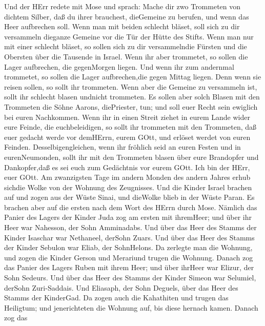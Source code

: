  Und der HErr redete mit Mose und sprach:  Mache
dir zwo Trommeten von dichtem Silber, daß du ihrer brauchest, dieGemeine
zu berufen, und wenn das Heer aufbrechen soll.  Wenn man mit
beiden schlecht bläset, soll sich zu dir versammeln dieganze Gemeine vor
die Tür der Hütte des Stifts.  Wenn man nur mit einer
schlecht bläset, so sollen sich zu dir versammelndie Fürsten und die
Obersten über die Tausende in Israel.  Wenn ihr aber
trommetet, so sollen die Lager aufbrechen, die gegenMorgen liegen.
 Und wenn ihr zum andernmal trommetet, so sollen die Lager
aufbrechen,die gegen Mittag liegen. Denn wenn sie reisen sollen, so
sollt ihr trommeten.  Wenn aber die Gemeine zu versammeln
ist, sollt ihr schlecht blasen undnicht trommeten.  Es
sollen aber solch Blasen mit den Trommeten die Söhne Aarons,
diePriester, tun; und soll euer Recht sein ewiglich bei euren
Nachkommen.  Wenn ihr in einen Streit ziehet in eurem Lande
wider eure Feinde, die euchbeleidigen, so sollt ihr trommeten mit den
Trommeten, daß euer gedacht werde vor demHErrn, eurem GOtt, und erlöset
werdet von euren Feinden.  Desselbigengleichen, wenn ihr
fröhlich seid an euren Festen und in eurenNeumonden, sollt ihr mit den
Trommeten blasen über eure Brandopfer und Dankopfer,daß es sei euch zum
Gedächtnis vor eurem GOtt. Ich bin der HErr, euer GOtt.  Am
zwanzigsten Tage im andern Monden des andern Jahres erhub sichdie Wolke
von der Wohnung des Zeugnisses.  Und die Kinder Israel
brachen auf und zogen aus der Wüste Sinai, und dieWolke blieb in der
Wüste Paran.  Es brachen aber auf die ersten nach dem Wort
des HErrn durch Mose.  Nämlich das Panier des Lagers der
Kinder Juda zog am ersten mit ihremHeer; und über ihr Heer war Nahesson,
der Sohn Amminadabs.  Und über das Heer des Stamms der
Kinder Isaschar war Nethaneel, derSohn Zuars.  Und über das
Heer des Stamms der Kinder Sebulon war Eliab, der SohnHelons.
 Da zerlegte man die Wohnung, und zogen die Kinder Gerson
und Merariund trugen die Wohnung.  Danach zog das Panier
des Lagers Ruben mit ihrem Heer; und über ihrHeer war Elizur, der Sohn
Sedeurs.  Und über das Heer des Stamms der Kinder Simeon
war Selumiel, derSohn Zuri-Saddais.  Und Eliasaph, der Sohn
Deguels, über das Heer des Stamms der KinderGad.  Da zogen
auch die Kahathiten und trugen das Heiligtum; und jenerichteten die
Wohnung auf, bis diese hernach kamen.  Danach zog das
